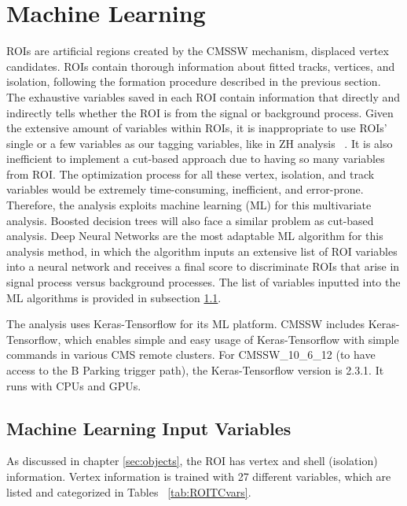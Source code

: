 \clearpage
\chapter{Machine Learning}\label{sec:machinelearning}
ROIs are artificial regions created by the CMSSW mechanism, displaced vertex candidates.
ROIs contain thorough information about fitted tracks, vertices, and isolation, following the formation procedure described in the previous section.
The exhaustive variables saved in each ROI contain information that directly and indirectly tells whether the ROI is from the signal or background process.
Given the extensive amount of variables within ROIs, it is inappropriate to use ROIs' single or a few variables as our tagging variables, like in ZH analysis ~\cite{ZHAN}.
It is also inefficient to implement a cut-based approach due to having so many variables from ROI.
The optimization process for all these vertex, isolation, and track variables would be extremely time-consuming, inefficient, and error-prone.
Therefore, the analysis exploits machine learning (ML) for this multivariate analysis.
Boosted decision trees will also face a similar problem as cut-based analysis.
Deep Neural Networks are the most adaptable ML algorithm for this analysis method, in which the algorithm inputs an extensive list of ROI variables into a neural network and receives a final score to discriminate ROIs that arise in signal process versus background processes.
The list of variables inputted into the ML algorithms is provided in subsection \ref{sec:MLIV}.

The analysis uses Keras-Tensorflow for its ML platform.
CMSSW includes Keras-Tensorflow, which enables simple and easy usage of Keras-Tensorflow with simple commands in various CMS remote clusters.
For CMSSW\_10\_6\_12 (to have access to the B Parking trigger path), the Keras-Tensorflow version is 2.3.1.
It runs with CPUs and GPUs.
\section{Machine Learning Input Variables}\label{sec:MLIV}
As discussed in chapter \ref{sec:objects}, the ROI has vertex and shell (isolation) information.
Vertex information is trained with 27 different variables, which are listed and categorized in Tables ~\ref{tab:ROITCvars}.


